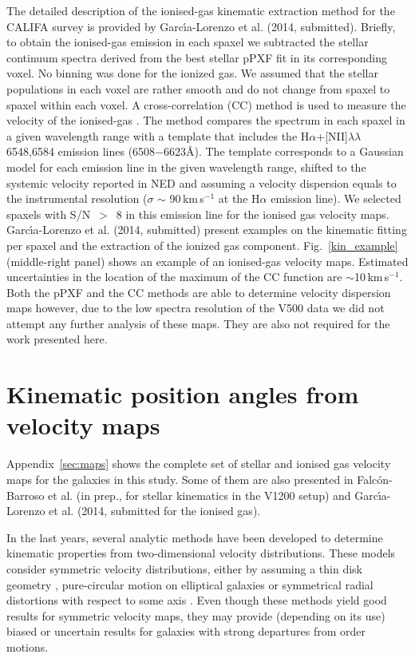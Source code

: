\documentclass[longauth,traditabstract]{aa}
\begin{document}
The detailed description of the ionised-gas kinematic extraction method for the CALIFA survey is provided by Garc\'{\i}a-Lorenzo et al. (2014, submitted). Briefly, to obtain the ionised-gas emission in each spaxel we subtracted the stellar continuum spectra derived from the best stellar pPXF fit in its corresponding voxel. No binning was done for the ionized gas.  We assumed that the stellar populations in each voxel are rather smooth and do not change from spaxel to spaxel within each voxel. A cross-correlation (CC) method is used to measure the velocity of the ionised-gas \citep[see ][for details on the method]{2013MNRAS.tmp..534G}. The method compares the spectrum in each spaxel in a given wavelength range  with a template that includes the H$\alpha$+[NII]$\lambda\lambda$6548,6584 emission lines (6508$-$6623\AA). The template corresponds to a Gaussian model for each emission line in the given wavelength range, shifted to the systemic velocity reported in NED and assuming a velocity dispersion equals to the instrumental resolution ($\sigma$ $\sim$ 90\,km\,s$^{-1}$ at the H$\alpha$ emission line). We selected spaxels with S/N \,$>$\, 8  in this emission line for the ionised gas velocity maps. Garc\'{\i}a-Lorenzo et al. (2014, submitted) present examples on the kinematic fitting per spaxel and the extraction of the ionized gas component. Fig.~\ref{kin_example} (middle-right panel) shows an example of an ionised-gas velocity maps. Estimated uncertainties in the location of the maximum of the CC function are $\sim$10\,km\,s$^{-1}$. Both the pPXF and the CC methods are able to determine velocity
dispersion maps  however, due to the low spectra resolution of the V500 data we
did not attempt any further analysis of these maps. They are also not required for the work presented here.

\section{Kinematic position angles from velocity maps}
\label{sec:Robust_Kinematic}

Appendix~\ref{sec:maps} shows the complete set of stellar and ionised gas
velocity maps for the galaxies in this study. Some of them are also presented 
in Falc\'{o}n-Barroso et al. (in prep., for stellar kinematics in the V1200 setup) and
Garc\'{\i}a-Lorenzo et al. (2014, submitted for the ionised gas).

In the last years, several analytic methods have been developed to determine
kinematic properties from two-dimensional velocity distributions. These models
consider symmetric velocity distributions, either by assuming a thin disk
geometry \citep[e.g., ][]{2003AJ....125.1164B, 2008MNRAS.388..500E},
pure-circular motion on elliptical galaxies \citep{2006MNRAS.366..787K} or
symmetrical radial distortions with respect to some axis
\citep{2007ApJ...664..204S}. Even though these methods
yield good results for symmetric velocity maps, they may provide (depending on
its use) biased or uncertain results for galaxies with strong departures from
order motions. 
\end{document}

